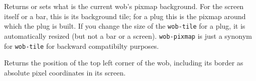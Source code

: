         

Returns or sets what is the current wob's pixmap background. For the screen
itself or a bar, this is its background tile; for a plug this is
the pixmap around which the plug is built. If you change the size of the
\verb"wob-tile" for a plug, it is automatically resized (but not a bar
or a screen). \verb"wob-pixmap" is just a synonym for \verb"wob-tile"
for backward compatibilty purposes.



Returns the position of the top left corner of the wob, including its border
as absolute pixel coordinates in its screen.
